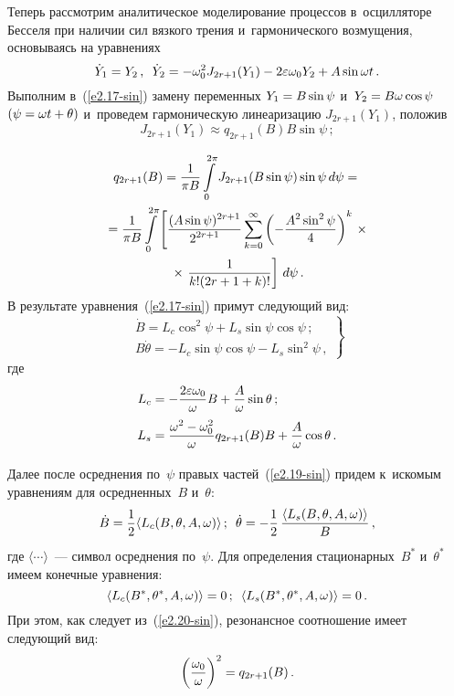\begin{multicols}{2}
{\pagebreak

Теперь рассмотрим аналитическое моделирование процессов в~осцилляторе 
Бесселя при наличии сил вязкого
трения и~гармонического возмущения, основываясь на уравнениях
\begin{equation}
\dot Y_1 = Y_2\,,\enskip \dot Y_2 = - \omega_0^2 J_{2r+1} (Y_1) - 2 \varepsilon 
\omega_0 Y_2 +A \sin \omega t\,.\label{e2.17-sin}
\end{equation}
Выполним в~(\ref{e2.17-sin}) замену переменных
$Y_1 \hm= B \sin \psi$ и~$Y_2 \hm= B\omega \cos \psi$ $(\psi \hm= \omega t \hm+\theta)$ 
и~проведем гармоническую линеаризацию $J_{2r+1} (Y_1)$, положив
    $$
    J_{2r+1} (Y_1) \approx q_{2r+1} (B) B \sin \psi\,;
    $$
    
    \vspace*{-12pt}
    
    \noindent
    \begin{multline*}
q_{2r+1} (B) = \fr{1}{\pi B} \iii_0^{2\pi} J_{2r+1} (B \sin \psi) \sin \psi\, d\psi={}\\
{}=
 \fr{1}{\pi B} \iii_0^{2\pi} \left[ \fr{(A\sin\psi)^{2r+1}}{2^{2r+1}} 
\sss_{k=0}^\infty \left(-\fr{A^2 \sin^2\psi}{4}\right)^k\right.\times{}\\
{}\times
\left.    \fr{1}{k! (2r+1+k)!}\right]\, d\psi\,. %
    \end{multline*}
В результате уравнения~(\ref{e2.17-sin}) примут следующий вид:
\begin{equation}
\left.
\begin{array}{c}
\dot B = L_c \cos^2 \psi + L_s \sin \psi \cos\psi\,;\\[6pt] 
B\dot\theta =-L_c \sin\psi \cos\psi - L_s \sin^2\psi\,,
\end{array}
\right\}
\label{e2.19-sin}
\end{equation}
где
\begin{align*}
L_c &= -\displaystyle\frac{\displaystyle 2\varepsilon \omega_0\mathstrut}{\displaystyle \omega\mathstrut} B + \displaystyle\frac{\displaystyle A\mathstrut}{\displaystyle \omega\mathstrut} 
\sin \theta\,;\\
L_s &= \displaystyle\frac{\displaystyle \omega^2 - \omega_0^2\mathstrut}{\displaystyle \omega\mathstrut} q_{2r+1} (B) B + \displaystyle\frac{\displaystyle A\mathstrut}{\displaystyle \omega\mathstrut} \cos \theta\,.
\end{align*}

Далее после осреднения по~$\psi$ правых частей~(\ref{e2.19-sin}) 
придем к~искомым уравнениям для осредненных~$B$ и~$\theta$:
\begin{equation}
\dot B =\displaystyle\frac{\displaystyle 1\mathstrut}{\displaystyle 2\mathstrut}\langle L_c (B, \theta, A,\omega)\rangle\,;\enskip 
\dot \theta =-\displaystyle\frac{\displaystyle 1\mathstrut}{\displaystyle 2\mathstrut}\,\displaystyle\frac{\displaystyle \langle L_s (B,\theta,A,\omega)\rangle\mathstrut}{\displaystyle B\mathstrut}\,,\label{e2.20-sin}
\end{equation}
где $\langle\cdots\rangle$~--- символ осреднения по~$\psi$.
Для определения стационарных~$B^*$ и~$\theta^*$ имеем конечные уравнения:
\begin{equation*}
\langle L_c (B^*,\theta^*,A,\omega)\rangle=0\,;\enskip 
\langle L_s (B^*,\theta^*,A,\omega)\rangle =0\,.
\end{equation*}
При этом, как следует из~(\ref{e2.20-sin}), резонансное соотношение имеет следующий вид:
\begin{equation}
\left(\displaystyle\frac{\displaystyle \omega_0\mathstrut}{\displaystyle \omega\mathstrut}\right)^2 = q_{2r+1} (B)\,.
\label{e2.22-sin}
\end{equation}

}
\end{multicols}
